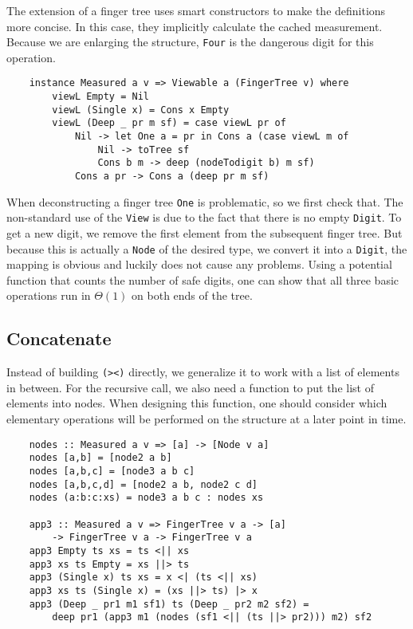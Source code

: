 The extension of a finger tree uses smart constructors to make the definitions more concise. In this case, they implicitly calculate the cached measurement. Because we are enlarging the structure, \texttt{Four} is the dangerous digit for this operation.

\begin{verbatim}
    instance Measured a v => Viewable a (FingerTree v) where
        viewL Empty = Nil
        viewL (Single x) = Cons x Empty
        viewL (Deep _ pr m sf) = case viewL pr of
            Nil -> let One a = pr in Cons a (case viewL m of
                Nil -> toTree sf
                Cons b m -> deep (nodeTodigit b) m sf)
            Cons a pr -> Cons a (deep pr m sf)
\end{verbatim}

When deconstructing a finger tree \texttt{One} is problematic, so we first check that. The non-standard use of the \texttt{View} is due to the fact that there is no empty \texttt{Digit}. To get a new digit, we remove the first element from the subsequent finger tree. But because this is actually a \texttt{Node} of the desired type, we convert it into a \texttt{Digit}, the mapping is obvious and luckily does not cause any problems. Using a potential function that counts the number of safe digits, one can show that all three basic operations run in \(\Theta(1)\) on both ends of the tree.\par

\subsection{Concatenate}

Instead of building \texttt{(><)} directly, we generalize it to work with a list of elements in between. For the recursive call, we also need a function to put the list of elements into nodes. When designing this function, one should consider which elementary operations will be performed on the structure at a later point in time.

\begin{verbatim}
    nodes :: Measured a v => [a] -> [Node v a]
    nodes [a,b] = [node2 a b]
    nodes [a,b,c] = [node3 a b c]
    nodes [a,b,c,d] = [node2 a b, node2 c d]
    nodes (a:b:c:xs) = node3 a b c : nodes xs

    app3 :: Measured a v => FingerTree v a -> [a]
        -> FingerTree v a -> FingerTree v a
    app3 Empty ts xs = ts <|| xs
    app3 xs ts Empty = xs ||> ts
    app3 (Single x) ts xs = x <| (ts <|| xs)
    app3 xs ts (Single x) = (xs ||> ts) |> x
    app3 (Deep _ pr1 m1 sf1) ts (Deep _ pr2 m2 sf2) =
        deep pr1 (app3 m1 (nodes (sf1 <|| (ts ||> pr2))) m2) sf2
\end{verbatim}

